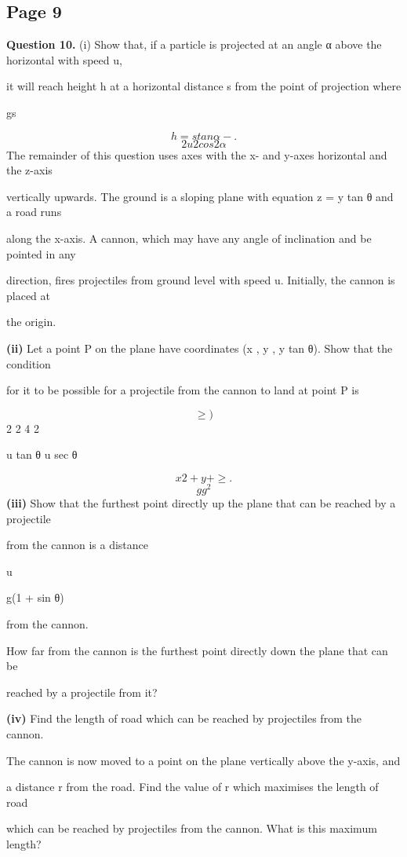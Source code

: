 \documentclass[12pt]{article}
\begin{document}
\subsection*{Page 9}
\begin{flushleft}
\bigskip\textbf{Question 10.} (i) Show that, if a particle is projected at an angle α above the horizontal with speed u,\par
it will reach height h at a horizontal distance s from the point of projection where\par
gs\par
\[h = s tan α - .\]
\[2u2 cos2 α\]
The remainder of this question uses axes with the x- and y-axes horizontal and the z-axis\par
vertically upwards. The ground is a sloping plane with equation z = y tan θ and a road runs\par
along the x-axis. A cannon, which may have any angle of inclination and be pointed in any\par
direction, fires projectiles from ground level with speed u. Initially, the cannon is placed at\par
the origin.\par
\textbf{(ii)} Let a point P on the plane have coordinates (x , y , y tan θ). Show that the condition\par
for it to be possible for a projectile from the cannon to land at point P is\par
\[\geq )\]
2 2 4 2\par
u tan θ u sec θ\par
\[x 2 + y + \geq .\]
\[g g^2\]
\textbf{(iii)} Show that the furthest point directly up the plane that can be reached by a projectile\par
from the cannon is a distance\par
u\par
g(1 + sin θ)\par
from the cannon.\par
How far from the cannon is the furthest point directly down the plane that can be\par
reached by a projectile from it?\par
\textbf{(iv)} Find the length of road which can be reached by projectiles from the cannon.\par
The cannon is now moved to a point on the plane vertically above the y-axis, and\par
a distance r from the road. Find the value of r which maximises the length of road\par
which can be reached by projectiles from the cannon. What is this maximum length?\par
\end{flushleft}
\end{document}
